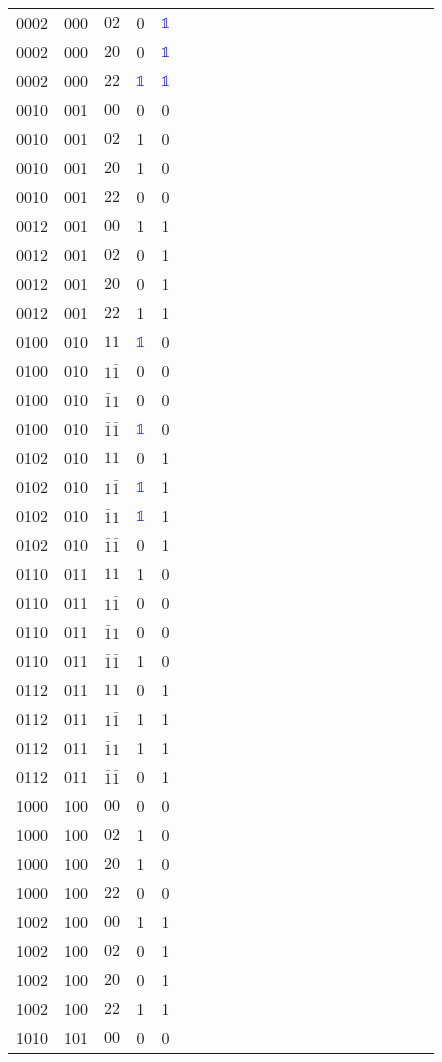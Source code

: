 \begin{longtable*}{c| cccccccccccccccccccc }
0002& 000& $02$& 0& \textcolor{blue}{$\mathds{1}$}\\
0002& 000& $20$& 0& \textcolor{blue}{$\mathds{1}$}\\
0002& 000& $22$& \textcolor{blue}{$\mathds{1}$}& \textcolor{blue}{$\mathds{1}$}\\
0010& 001& $00$& 0& 0\\
0010& 001& $02$& 1& 0\\
0010& 001& $20$& 1& 0\\
0010& 001& $22$& 0& 0\\
0012& 001& $00$& 1& 1\\
0012& 001& $02$& 0& 1\\
0012& 001& $20$& 0& 1\\
0012& 001& $22$& 1& 1\\
0100& 010& $11$& \textcolor{blue}{$\mathds{1}$}& 0\\
0100& 010& $1\bar{1}$& 0& 0\\
0100& 010& $\bar{1}1$& 0& 0\\
0100& 010& $\bar{1}\bar{1}$& \textcolor{blue}{$\mathds{1}$}& 0\\
0102& 010& $11$& 0& 1\\
0102& 010& $1\bar{1}$& \textcolor{blue}{$\mathds{1}$}& 1\\
0102& 010& $\bar{1}1$& \textcolor{blue}{$\mathds{1}$}& 1\\
0102& 010& $\bar{1}\bar{1}$& 0& 1\\
0110& 011& $11$& 1& 0\\
0110& 011& $1\bar{1}$& 0& 0\\
0110& 011& $\bar{1}1$& 0& 0\\
0110& 011& $\bar{1}\bar{1}$& 1& 0\\
0112& 011& $11$& 0& 1\\
0112& 011& $1\bar{1}$& 1& 1\\
0112& 011& $\bar{1}1$& 1& 1\\
0112& 011& $\bar{1}\bar{1}$& 0& 1\\
1000& 100& $00$& 0& 0\\
1000& 100& $02$& 1& 0\\
1000& 100& $20$& 1& 0\\
1000& 100& $22$& 0& 0\\
1002& 100& $00$& 1& 1\\
1002& 100& $02$& 0& 1\\
1002& 100& $20$& 0& 1\\
1002& 100& $22$& 1& 1\\
1010& 101& $00$& 0& 0\\

\end{longtable*}

